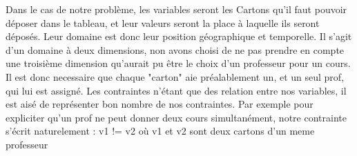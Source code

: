Dans le cas de notre problème, les variables seront les Cartons qu'il faut pouvoir déposer dans le tableau, et leur valeurs seront la place à laquelle ils seront déposés. Leur domaine est donc leur position géographique et temporelle. Il s'agit d'un domaine à deux dimensions, non avons choisi de ne pas prendre en compte une troisième dimension qu'aurait pu être le choix d'un professeur pour un cours. Il est donc necessaire que chaque "carton" aie préalablement un, et un seul prof, qui lui est assigné.
Les contraintes n'étant que des relation entre nos variables, il est aisé de représenter bon nombre de nos contraintes. Par exemple pour expliciter qu'un prof ne peut donner deux cours simultanément, notre contrainte s'écrit naturelement :
v1 != v2 où v1 et v2 sont deux cartons d'un meme professeur
% 
% 
